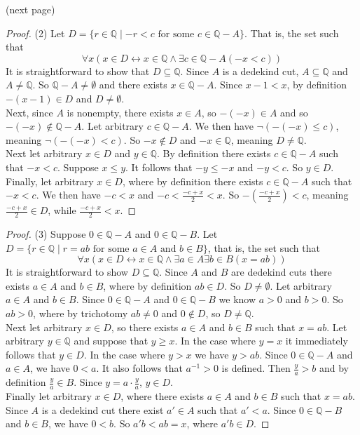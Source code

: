 \documentclass{report}
\begin{document}
\noindent(next page)\newpage
\begin{proof}(2)
Let $D=\{r\in\mathbb Q\mid-r<c\text{ for some }c\in\mathbb Q-A\}$. That is, the set such that
\begin{equation*}
\forall x(x\in D\leftrightarrow x\in\mathbb Q\land\exists c\in\mathbb Q-A(-x<c))
\end{equation*}
It is straightforward to show that $D\subseteq\mathbb Q$. Since $A$ is a dedekind cut, $A\subseteq\mathbb Q$ and $A\neq\mathbb Q$. So 
$\mathbb Q-A\neq\emptyset$ and there exists $x\in\mathbb Q-A$.
Since $x-1<x$, by definition $-(x-1)\in D$ and $D\neq\emptyset$.\\
\indent Next, since $A$ is nonempty, there exists $x\in A$, so $-(-x)\in A$ and so $-(-x)\notin\mathbb Q-A$. Let arbitrary $c\in\mathbb Q-A$.
We then have $\neg(-(-x)\leq c)$, meaning $\neg(-(-x)<c)$. So $-x\notin D$ and $-x\in\mathbb Q$, meaning $D\neq\mathbb Q$.\\
\indent Next let arbitrary $x\in D$ and $y\in\mathbb Q$. By definition there exists $c\in\mathbb Q-A$ such that $-x<c$.
Suppose $x\leq y$. It follows that $-y\leq-x$ and $-y<c$. So $y\in D$.\\
\indent Finally, let arbitrary $x\in D$, where by definition there exists $c\in\mathbb Q-A$ such that $-x<c$. We then have $-c<x$ and
$-c<\frac{-c+x}{2}<x$. 
So $-\left(\frac{-c+x}{2}\right)<c$, meaning $\frac{-c+x}{2}\in D$, while $\frac{-c+x}{2}<x$.\qedhere
\end{proof}
\begin{proof}(3)
Suppose $0\in\mathbb Q-A$ and $0\in\mathbb Q-B$.
Let $D=\{r\in\mathbb Q\mid r=ab\text{ for some $a\in A$ and $b\in B$}\}$,
that is, the set such that
\begin{equation*}
\forall x(x\in D\leftrightarrow x\in\mathbb Q\land\exists a\in A\exists b\in B(x=ab))
\end{equation*}
It is straightforward to show $D\subseteq\mathbb Q$.
Since $A$ and $B$ are dedekind cuts there exists $a\in A$ and $b\in B$, where by definition $ab\in D$. So $D\neq\emptyset$.
Let arbitrary $a\in A$ and $b\in B$. Since $0\in\mathbb Q-A$ and $0\in\mathbb Q-B$ we know $a>0$ and $b>0$. So $ab>0$, where by trichotomy
$ab\neq0$ and $0\notin D$, so $D\neq\mathbb Q$.\\
\indent Next let arbitrary $x\in D$, so there exists $a\in A$ and $b\in B$ such that $x=ab$.
Let arbitrary $y\in\mathbb Q$ and suppose that $y\geq x$. In the case where $y=x$ it immediately follows that
$y\in D$. In the case where $y>x$ we have $y>ab$. Since $0\in\mathbb Q-A$ and $a\in A$, we have $0<a$. It also follows that $a^{-1}>0$ is defined.
Then $\frac{y}{a}>b$ and by definition $\frac{y}{a}\in B$.
Since $y=a\cdot\frac{y}{a}$, $y\in D$.\\
\indent Finally let arbitrary $x\in D$, where there exists $a\in A$ and $b\in B$ such that $x=ab$. Since $A$ is a dedekind cut there exist $a'\in A$
such that $a'<a$. Since $0\in\mathbb Q-B$ and $b\in B$, we have $0<b$. So
$a'b<ab=x$, where $a'b\in D$.
\end{proof}
\end{document}
